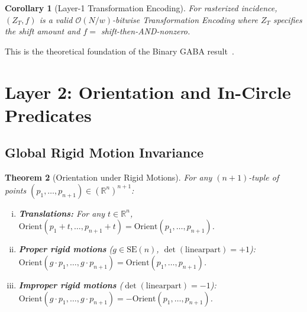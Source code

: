 \documentclass[11pt,letterpaper]{article}
\newtheorem{theorem}{Theorem}[section]
\newtheorem{corollary}[theorem]{Corollary}
\newcommand{\RR}{\mathbb{R}}
\newcommand{\Orient}{\mathrm{Orient}}
\newcommand{\cO}{\mathcal{O}}
\newcommand{\wt}{w}       %
\begin{document}
\begin{corollary}[Layer-1 Transformation Encoding]
For rasterized incidence, $(Z_T,f)$ is a valid $\cO(N/\wt)$-bitwise Transformation
Encoding where $Z_T$ specifies the shift amount and $f=$ shift-then-AND-nonzero.
\end{corollary}

This is the theoretical foundation of the Binary GABA result~\cite{Dang25}.

\section{Layer 2: Orientation and In-Circle Predicates}\label{sec:layer2}

\subsection{Global Rigid Motion Invariance}

\begin{theorem}[Orientation under Rigid Motions]\label{thm:orient_rigid}
For any $(n+1)$-tuple of points $(p_1,\dots,p_{n+1})\in(\RR^n)^{n+1}$:
\begin{enumerate}[(i)]
\item \textbf{Translations:} For any $t\in\RR^n$,
  $\Orient(p_1+t,\dots,p_{n+1}+t)=\Orient(p_1,\dots,p_{n+1})$.
\item \textbf{Proper rigid motions} ($g\in\mathrm{SE}(n)$, $\det(\mathrm{linear part})=+1$):
  $\Orient(g\cdot p_1,\dots,g\cdot p_{n+1})=\Orient(p_1,\dots,p_{n+1})$.
\item \textbf{Improper rigid motions} ($\det(\mathrm{linear part})=-1$):
  $\Orient(g\cdot p_1,\dots,g\cdot p_{n+1})=-\Orient(p_1,\dots,p_{n+1})$.
\end{enumerate}
\end{theorem}
\end{document}
